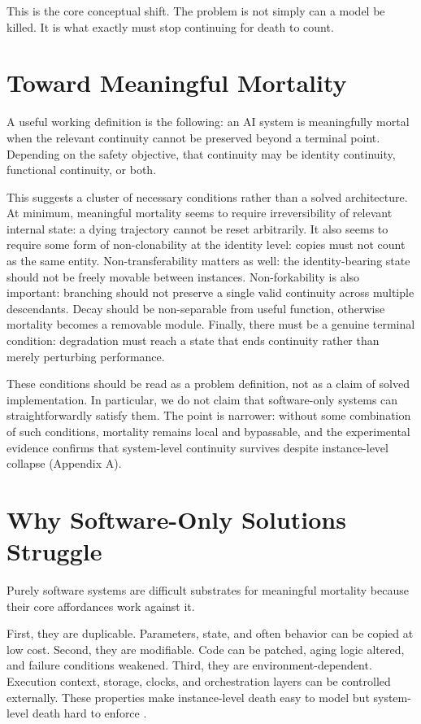 \documentclass[11pt]{article}
\begin{document}
This is the core conceptual shift. The problem is not simply can a model be killed. It is what exactly must stop continuing for death to count.

\newpage
\section{Toward Meaningful Mortality}

A useful working definition is the following: an AI system is meaningfully mortal when the relevant continuity cannot be preserved beyond a terminal point. Depending on the safety objective, that continuity may be identity continuity, functional continuity, or both.

This suggests a cluster of necessary conditions rather than a solved architecture. At minimum, meaningful mortality seems to require irreversibility of relevant internal state: a dying trajectory cannot be reset arbitrarily. It also seems to require some form of non-clonability at the identity level: copies must not count as the same entity. Non-transferability matters as well: the identity-bearing state should not be freely movable between instances. Non-forkability is also important: branching should not preserve a single valid continuity across multiple descendants. Decay should be non-separable from useful function, otherwise mortality becomes a removable module. Finally, there must be a genuine terminal condition: degradation must reach a state that ends continuity rather than merely perturbing performance.

These conditions should be read as a problem definition, not as a claim of solved implementation. In particular, we do not claim that software-only systems can straightforwardly satisfy them. The point is narrower: without some combination of such conditions, mortality remains local and bypassable, and the experimental evidence confirms that system-level continuity survives despite instance-level collapse (Appendix A).

\newpage
\section{Why Software-Only Solutions Struggle}

Purely software systems are difficult substrates for meaningful mortality because their core affordances work against it.

First, they are duplicable. Parameters, state, and often behavior can be copied at low cost. Second, they are modifiable. Code can be patched, aging logic altered, and failure conditions weakened. Third, they are environment-dependent. Execution context, storage, clocks, and orchestration layers can be controlled externally. These properties make instance-level death easy to model but system-level death hard to enforce \cite{corrigibility,safely-interruptible}.
\end{document}
